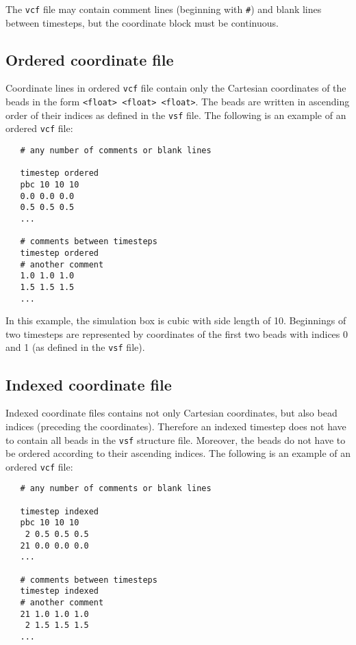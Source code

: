 The \texttt{vcf} file may contain comment lines (beginning with
\texttt{\#}) and blank lines between timesteps, but the coordinate block
must be continuous.

\subsection{Ordered coordinate file} \label{ssec:OrderedVcf}

Coordinate lines in ordered \texttt{vcf} file contain only the Cartesian
coordinates of the beads in the form \texttt{<float> <float> <float>}. The
beads are written in ascending order of their indices as defined in the
\texttt{vsf} file. The following is an example of an ordered \texttt{vcf}
file:

\begin{verbatim}
   # any number of comments or blank lines

   timestep ordered
   pbc 10 10 10
   0.0 0.0 0.0
   0.5 0.5 0.5
   ...

   # comments between timesteps
   timestep ordered
   # another comment
   1.0 1.0 1.0
   1.5 1.5 1.5
   ...
\end{verbatim}

In this example, the simulation box is cubic with side length of 10.
Beginnings of two timesteps are represented by coordinates of the first two
beads with indices 0 and 1 (as defined in the \texttt{vsf} file).

\subsection{Indexed coordinate file} \label{ssec:IndexedVcf}

Indexed coordinate files contains not only Cartesian coordinates, but also
bead indices (preceding the coordinates). Therefore an
indexed timestep does not have to contain all beads in the \texttt{vsf}
structure file. Moreover, the beads do not have to be ordered according to
their ascending indices.  The following is an example of an ordered
\texttt{vcf} file:

\begin{verbatim}
   # any number of comments or blank lines

   timestep indexed
   pbc 10 10 10
    2 0.5 0.5 0.5
   21 0.0 0.0 0.0
   ...

   # comments between timesteps
   timestep indexed
   # another comment
   21 1.0 1.0 1.0
    2 1.5 1.5 1.5
   ...
\end{verbatim}

